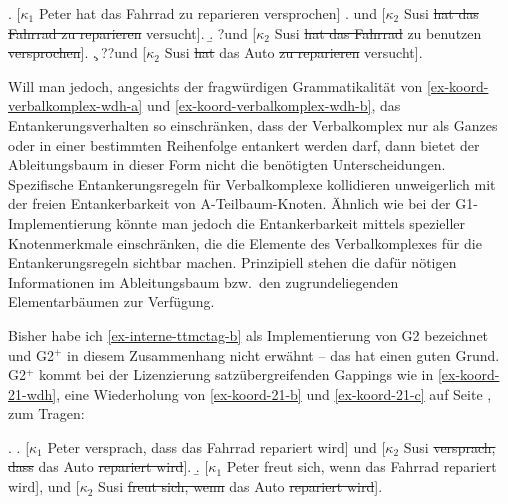 \ex. [$\kappa_1$ Peter hat das Fahrrad zu reparieren versprochen]\label{ex-koord-verbalkomplex-wdh}
\a. und [$\kappa_2$ Susi \sout{hat das Fahrrad zu reparieren} versucht].
\b. ?und [$\kappa_2$ Susi \sout{hat das Fahrrad} zu benutzen \sout{versprochen}].\label{ex-koord-verbalkomplex-wdh-a}
\c. ??und [$\kappa_2$  Susi \sout{hat} das Auto \sout{zu reparieren} versucht].\label{ex-koord-verbalkomplex-wdh-b}

\largerpage
Will man jedoch, angesichts der fragwürdigen Grammatikalität von \ref{ex-koord-verbalkomplex-wdh-a} und \ref{ex-koord-verbalkomplex-wdh-b}, das Entankerungsverhalten so einschränken, dass der Verbalkomplex nur als Ganzes oder in einer bestimmten Reihenfolge entankert werden darf, dann bietet der Ableitungsbaum in dieser Form nicht die benötigten Unterscheidungen. Spezifische Entankerungsregeln für Verbalkomplexe kollidieren unweigerlich mit der freien Entankerbarkeit von A-Teilbaum-Knoten. Ähnlich wie bei der G1-Implementierung könnte man jedoch die Entankerbarkeit mittels spezieller Knotenmerkmale einschränken, die die Elemente des Verbalkomplexes für die Entankerungsregeln sichtbar machen. Prinzipiell stehen die dafür nötigen Informationen im Ableitungsbaum bzw.\ den zugrundeliegenden Elementarbäumen zur Verfügung. 

Bisher habe ich \ref{ex-interne-ttmctag-b} als Implementierung von G2 bezeichnet und G2$^+$ in diesem Zusammenhang nicht erwähnt -- das hat einen guten Grund. G2$^+$ kommt bei der Lizenzierung satzübergreifenden Gappings wie in \ref{ex-koord-21-wdh}, eine Wiederholung von \ref{ex-koord-21-b} und \ref{ex-koord-21-c} auf Seite \pageref{ex-koord-21-b}, zum Tragen:
\largerpage%

\ex. \label{ex-koord-21-wdh}
\a. \label{ex-koord-21-b-wdh}[$\kappa_1$ Peter versprach, dass das Fahrrad repariert wird] und [$\kappa_2$ Susi \sout{versprach, dass} das Auto \sout{repariert wird}].
\b. \label{ex-koord-21-c-wdh}[$\kappa_1$ Peter freut sich, wenn das Fahrrad repariert wird], und [$\kappa_2$ Susi \sout{freut sich, wenn} das Auto \sout{repariert wird}].
 
